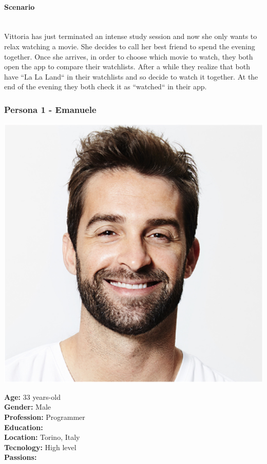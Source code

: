 \documentclass[12pt, a4paper]{article}
\begin{document}
\paragraph{Scenario}\mbox{}\\
Vittoria has just terminated an intense study session and now she only wants to 
relax watching a movie. She decides to call her best friend to spend the evening together. 
Once she arrives, in order to choose which movie to watch, they both open the app to 
compare their watchlists. After a while they realize that both have “La La Land“ in their 
watchlists and so decide to watch it together.
At the end of the evening they both check it as “watched“ in their app. 

\subsubsection{Persona 1 - Emanuele}

\begin{minipage}{0.25\textwidth}
	\includegraphics[width=1\textwidth]{images/emanuele.png}
\end{minipage}
\hspace{0.02\linewidth}
\begin{minipage}{0.6\textwidth} 
	\textbf{Age:} 33 years-old\\
	\textbf{Gender:} Male\\
	\textbf{Profession:} Programmer\\
	\textbf{Education:} \\
	\textbf{Location:} Torino, Italy\\
	\textbf{Tecnology:} High level\\
	\textbf{Passions:} \\
\end{minipage}
\end{document}
